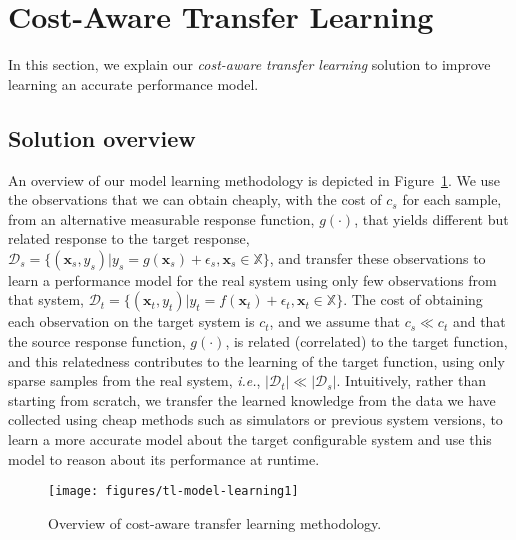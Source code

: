 \section{Cost-Aware Transfer Learning}
\label{sec:approach}

In this section, we explain our \emph{cost-aware transfer learning} solution to improve learning an accurate performance model.

\subsection{Solution overview}

An overview of our model learning methodology is depicted in Figure~\ref{fig:prediction-tl}. We use the observations that we can obtain cheaply, with the cost of $c_s$ for each sample, from an alternative measurable response function, $g(\cdot)$, that yields different but related response to the target response, $\mathcal{D}_s=\{(\mathbf{x}_s,y_s)|y_s=g(\mathbf{x}_s)+\epsilon_s, \mathbf{x}_s\in \mathbb{X}\}$, and transfer these observations to learn a performance model for the real system using only few observations from that system, $\mathcal{D}_t=\{(\mathbf{x}_t,y_t)|y_t=f(\mathbf{x}_t)+\epsilon_t, \mathbf{x}_t\in \mathbb{X}\}$.
The cost of obtaining each observation on the target system is $c_t$, and we assume that $c_s\ll c_t$ and that the source response function, $g(\cdot)$, is related (correlated) to the target function, and this relatedness contributes to the learning of the target function, using only sparse samples from the real system, \emph{i.e.}, $|\mathcal{D}_t|\ll |\mathcal{D}_s|$. Intuitively, rather than starting from scratch, we transfer the learned knowledge from the data we have collected using cheap methods such as simulators or previous system versions, to learn a more accurate model about the target configurable system and use this model to reason about its performance at runtime.

\begin{figure}[t]
	\begin{center}
		\texttt{[image: figures/tl-model-learning1]}
		\caption{Overview of cost-aware transfer learning methodology.} %
		\label{fig:prediction-tl}
	\end{center}
\end{figure}



